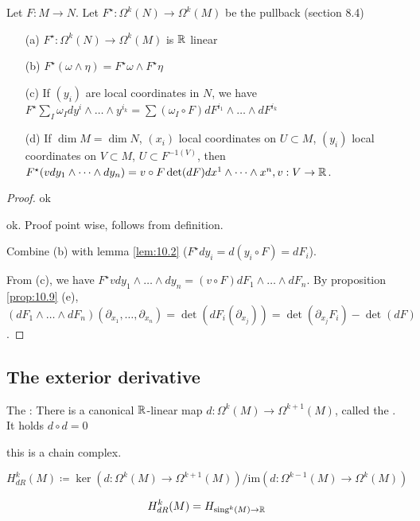 \begin{lemma}\label{lem:1.10}
    Let \(F:M\to N\). Let \(F^\star:\Omega^k(N)\to\Omega^k(M)\) be the pullback (section 8.4) %
    \begin{enumerate}
        \item[(a)] \(F^\star:\Omega^k(N)\to\Omega^k(M)\) is \(\mathbb{R}\) linear 
        \item[(b)] \(F^\star(\omega\wedge \eta)=F^\star \omega\wedge F^\star \eta \)
        \item[(c)] If \((y_i)\) are local coordinates in \(N\), we have \(F^\star\sum_I \omega_I dy^i\wedge\dots\wedge y^{i_k}=\sum (\omega_I\circ F)dF^{i_1}\wedge \dots\wedge dF^{i_k}\)
        \item[(d)] If \(\dim M=\dim N\), \((x_i)\) local coordinates on \(U\subset M\), \((y_i)\) local coordinates on \(V\subset M\), \(U\subset F^{-1(V)}\),
                   then \(F^\star(vdy_1\wedge \dots \wedge dy_n)=v\circ F\det (dF)dx^1\wedge \dots \wedge x^n, v:V\to \mathbb{R}\).   
    \end{enumerate}
\end{lemma}

\begin{proof}
     ok

     ok. Proof point wise, follows from definition.

     Combine (b) with lemma \ref{lem:10.2} (\(F^\star dy_i=d(y_i\circ F)=dF_i\)).

     From (c), we have \(F^\star vdy_1\wedge\dots\wedge dy_n=(v\circ F)dF_1\wedge \dots\wedge dF_n\).
    By proposition \ref{prop:10.9} (e), \((dF_1\wedge\dots\wedge dF_n)(\partial_{x_1},\dots,\partial_{x_n})=\det(dF_i(\partial_{x_j}))=\det(\partial_{x_j}F_i)-\det(dF)\).

\end{proof}

\subsection{The exterior derivative}

The : There is a canonical \(\mathbb{R}\)-linear map \(d:\Omega^k(M)\to\Omega^{k+1}(M)\), called 
the . It holds \(d\circ d=0\)
this is a chain complex.

\begin{definition*}
    \(H_{dR}^k(M)\coloneqq \ker(d:\Omega^k(M)\to\Omega^{k+1}(M))/\text{im}(d:\Omega^{k-1}(M)\to\Omega^k(M))\)
\end{definition*}

\begin{theorem}[deRham]\label{thm:10.11}\label{Non examable.}
    \[H_{dR}^k(M)=H_{\text{sing}^k(M)\to\mathbb{R}}\]
\end{theorem}



